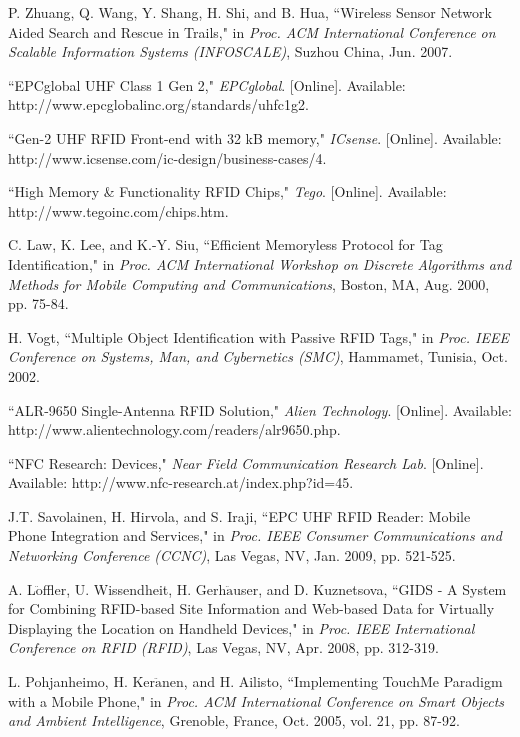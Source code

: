 \documentclass[conference]{IEEEtran}
\begin{document}
\begin{thebibliography}{1}
P. Zhuang, Q. Wang, Y. Shang, H. Shi, and B. Hua, ``Wireless Sensor Network Aided Search and Rescue in Trails," in \emph{Proc. ACM International Conference on Scalable Information Systems (INFOSCALE)}, Suzhou China, Jun. 2007.

``EPCglobal UHF Class 1 Gen 2," \emph{EPCglobal}. [Online]. Available: http://www.epcglobalinc.org/standards/uhfc1g2.

``Gen-2 UHF RFID Front-end with 32 kB memory," \emph{ICsense}. [Online]. Available: http://www.icsense.com/ic-design/business-cases/4.

``High Memory \& Functionality RFID Chips," \emph{Tego}. [Online]. Available: http://www.tegoinc.com/chips.htm.

C. Law, K. Lee, and K.-Y. Siu, ``Efficient Memoryless Protocol for Tag Identification," in \emph{Proc. ACM International Workshop on Discrete Algorithms and Methods for Mobile Computing and Communications}, Boston, MA, Aug. 2000, pp. 75-84.

H. Vogt, ``Multiple Object Identification with Passive RFID Tags," in \emph{Proc. IEEE Conference on Systems, Man, and Cybernetics (SMC)}, Hammamet, Tunisia, Oct. 2002.

``ALR-9650 Single-Antenna RFID Solution," \emph{Alien Technology}. [Online]. Available: http://www.alientechnology.com/readers/alr9650.php.

``NFC Research: Devices," \emph{Near Field Communication Research Lab}. [Online]. Available: http://www.nfc-research.at/index.php?id=45.

J.T. Savolainen, H. Hirvola, and S. Iraji, ``EPC UHF RFID Reader: Mobile Phone Integration and Services," in \emph{Proc. IEEE Consumer Communications and Networking Conference (CCNC)}, Las Vegas, NV, Jan. 2009, pp. 521-525.

A. L$\ddot{\mbox{o}}$ffler, U. Wissendheit, H. Gerh$\ddot{\mbox{a}}$user, and D. Kuznetsova, ``GIDS - A System for Combining RFID-based Site Information and Web-based Data for Virtually Displaying the Location on Handheld Devices," in \emph{Proc. IEEE International Conference on RFID (RFID)}, Las Vegas, NV, Apr. 2008, pp. 312-319.

L. Pohjanheimo, H. Ker$\ddot{\mbox{a}}$nen, and H. Ailisto, ``Implementing TouchMe Paradigm with a Mobile Phone," in \emph{Proc. ACM International Conference on Smart Objects and Ambient Intelligence}, Grenoble, France, Oct. 2005, vol. 21, pp. 87-92.


\end{thebibliography}
\end{document}

